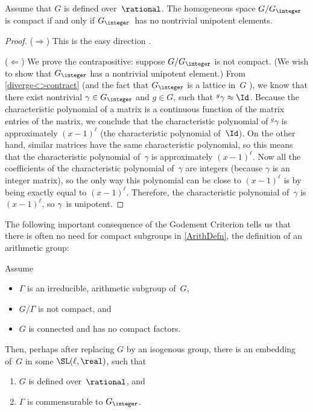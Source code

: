 \begin{prop}
\label{GodementCriterion}
 Assume that $G$ is defined over\/~$\rational$. The homogeneous
space $G/G_{\integer}$ is compact if and only if\/
$G_{\integer}$~has no nontrivial unipotent elements.
 \end{prop}

\begin{proof}
 ($\Rightarrow$) This is the easy direction
.

($\Leftarrow$) We prove the contrapositive: suppose
$G/G_{\integer}$ is not compact. (We wish to show
that $G_{\integer}$ has a nontrivial unipotent element.)
 From \cref{diverge<>contract} (and the fact that
$G_{\integer}$ is a lattice in~$G$ ), we
know that there exist nontrivial $\gamma \in G_{\integer}$
and $g \in G$, such that ${}^g \gamma \approx \Id$. Because the
characteristic polynomial of a matrix is a continuous
function of the matrix entries of the matrix, we conclude
that the characteristic polynomial of ${}^g \gamma$ is
approximately $(x-1)^\ell$ (the characteristic polynomial
of~$\Id$). On the other hand, similar matrices have the same
characteristic polynomial, so this means that the
characteristic polynomial of~$\gamma$ is approximately
$(x-1)^\ell$. Now all the coefficients of the characteristic
polynomial of~$\gamma$ are integers (because $\gamma$ is an
integer matrix), so the only way this polynomial can be
close to $(x-1)^\ell$ is by being exactly equal to
$(x-1)^\ell$. Therefore, the characteristic polynomial
of~$\gamma$ is $(x-1)^\ell$, so $\gamma$~is unipotent.
 \end{proof}

The following important consequence of the Godement Criterion tells us that there is often no need for compact subgroups in \cref{ArithDefn}, the definition of an arithmetic group:

\begin{cor} \label{IrredNoncpct->NoROS}
 Assume 
 	\begin{itemize}
	\item $\Gamma$ is an irreducible, arithmetic subgroup of~$G$, 
	\item $G/\Gamma$ is not compact,
	and
	\item $G$ is connected and has no compact factors.
	\end{itemize}
Then, perhaps after replacing $G$ by an isogenous group, there is an
embedding of~$G$ in some\/ $\SL(\ell,\real)$, such that 
 	\begin{enumerate}
 	\item $G$ is defined over\/~$\rational$, and
	 \item $\Gamma$ is commensurable to $G_{\integer}$.
 	\end{enumerate}
\end{cor}

